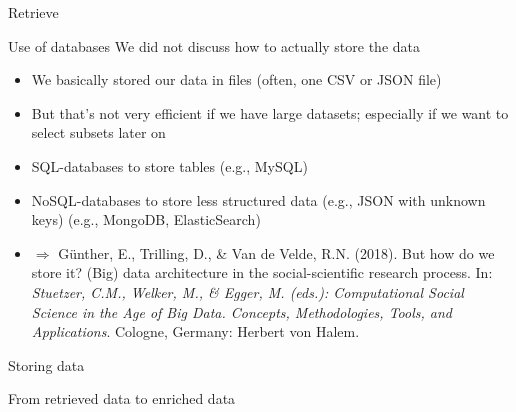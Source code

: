 \documentclass{beamer}
\begin{document}
\begin{frame}{Retrieve}
	\begin{block}{Use of databases}
	We did not discuss how to actually store the data
	\begin{itemize}
		\item We basically stored our data in files (often, one CSV or JSON file)
		\item But that's not very efficient if we have large datasets; especially if we want to select subsets later on
		\item SQL-databases to store tables (e.g., MySQL)
		\item NoSQL-databases to store less structured data (e.g., JSON with unknown keys) (e.g., MongoDB, ElasticSearch)
		\item $\Rightarrow$ \tiny{Günther, E., Trilling, D., \& Van de Velde, R.N. (2018). But how do we store it? (Big) data architecture in the social-scientific research process. In:\textit{ Stuetzer, C.M., Welker, M., \& Egger, M. (eds.): Computational Social Science in the Age of Big Data. Concepts, Methodologies, Tools, and Applications}. Cologne, Germany: Herbert von Halem.}
	\end{itemize}
	\end{block}
\end{frame}





\begin{frame}{Storing data}
\end{frame}




\begin{frame}{From retrieved data to enriched data}
\end{frame}

%
%
%
%
%
\end{document}
